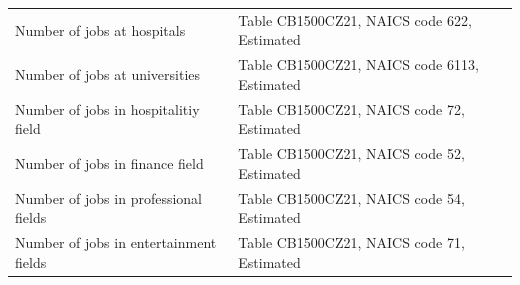 \documentclass[11pt]{article}
\begin{document}
\begin{appendices}
\begin{tabular}{ll}
Number of jobs at hospitals&Table CB1500CZ21, NAICS code 622, Estimated\\
Number of jobs at universities&Table CB1500CZ21, NAICS code 6113, Estimated\\
Number of jobs in hospitalitiy field&Table CB1500CZ21, NAICS code 72, Estimated\\
Number of jobs in finance field&Table CB1500CZ21, NAICS code 52, Estimated\\
Number of jobs in professional fields&Table CB1500CZ21, NAICS code 54, Estimated\\
Number of jobs in entertainment fields&Table CB1500CZ21, NAICS code 71, Estimated\\
\end{tabular}
\endgroup

\end{appendices}










 

\pagebreak
\end{document}
